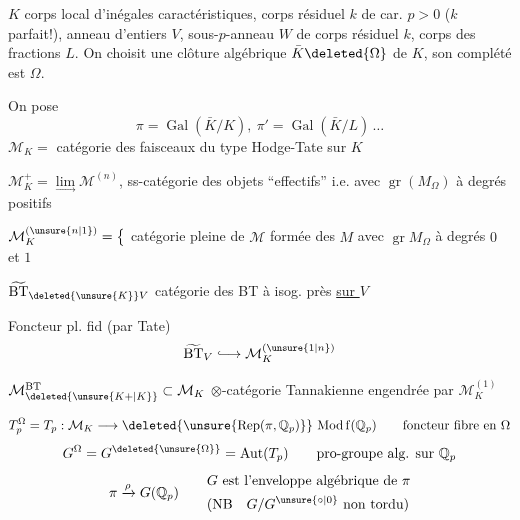  $K$ corps local d’inégales caractéristiques, corps résiduel $k$ de car. $p>0$ ($k$ parfait!), anneau d’entiers $V$, sous-$p$-anneau $W$ de corps résiduel $k$, corps des fractions $L$. On choisit une clôture algébrique $\bar K\deleted{\Omega}$ de $K$, son complété est $\Omega$.


On pose
\[
\pi=\operatorname{Gal}(\bar K/K),\ \pi'=\operatorname{Gal}(\bar K/L)\,\ldots
\]
$\mathcal M_K=$ catégorie des faisceaux du type Hodge-Tate sur $K$ 

$\mathcal M_K^+=\underset{\longrightarrow}{\lim}\mathcal M^{(n)}$, ss-catégorie des objets ``effectifs'' i.e. avec  $\operatorname{gr}(M_\Omega)$ à degrés positifs

$\mathcal M_K^{(\unsure{n|1})}=\bigl\{$ catégorie pleine de $\mathcal M$ formée des $M$ avec $\operatorname{gr}M_\Omega$ à degrés $0$ et $1$

$\widetilde{\mathrm{BT}}_{\deleted{\unsure{K}}V}$ catégorie des BT à isog. près \uline{sur $V$}

Foncteur pl. fid (par Tate)
\[
\widetilde{\mathrm{BT}}_V\lhook\joinrel\longrightarrow\mathcal M_K^{(\unsure{1|n})}
\]

$\mathcal M_{\deleted{\unsure{K+|K}}}^{\mathrm{BT}}\subset\mathcal M_K$ $\otimes$-catégorie Tannakienne engendrée par $\mathcal M_K^{(1)}$

\[
T_p^\Omega=T_p:\mathcal M_K\longrightarrow\deleted{\unsure{\operatorname{Rep}(\pi,\mathbb Q_p)}}\,\operatorname{Mod\,f}(\mathbb Q_p)
\qquad\text{foncteur fibre en }\Omega
\]
\[
G^\Omega=G^{\deleted{\unsure{\Omega}}}=\operatorname{Aut}(T_p)
\qquad\text{pro-groupe alg. sur }\mathbb Q_p
\]
\[
\pi\xrightarrow{\rho}G(\mathbb Q_p)\qquad
\begin{aligned}
&G\text{ est l’enveloppe algébrique de }\pi\\
&(\mathrm{NB}\quad G/G^{\unsure{\circ|0}}\ \text{non tordu})
\end{aligned}
\]

